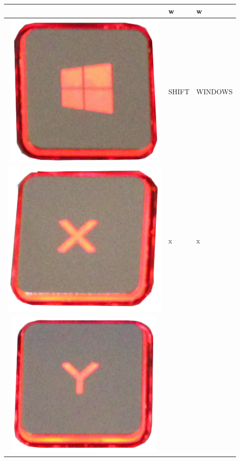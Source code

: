\begin{longtable}{|cll|}
\begin{minipage}[c]{.4\textwidth}
\vspace{0.2cm}
\end{minipage} & w & w\\
\hline
\begin{minipage}[c]{.4\textwidth}
\vspace{0.2cm}
\includegraphics[scale=0.08]{Images/KeyMapping/WINDOWS}
\vspace{0.2cm}
\end{minipage} & SHIFT & WINDOWS\\
\hline
\begin{minipage}[c]{.4\textwidth}
\vspace{0.2cm}
\includegraphics[scale=0.08]{Images/KeyMapping/x}
\vspace{0.2cm}
\end{minipage} & x & x\\
\hline
\begin{minipage}[c]{.4\textwidth}
\vspace{0.2cm}
\includegraphics[scale=0.08]{Images/KeyMapping/y}

\end{minipage}
\end{longtable}
